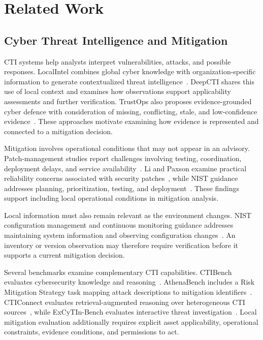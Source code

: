 \documentclass[conference]{IEEEtran}
\begin{document}
\section{Related Work}

\subsection{Cyber Threat Intelligence and Mitigation}

CTI systems help analysts interpret vulnerabilities, attacks, and
possible responses. LocalIntel combines global cyber knowledge with
organization-specific information to generate contextualized threat
intelligence~\cite{mitra2024localintel}. DeepCTI shares this use of local
context and examines how observations support applicability assessments
and further verification. TrustOps also proposes evidence-grounded
cyber defence with consideration of missing, conflicting, stale, and
low-confidence evidence~\cite{malamas2026trustops}. These approaches
motivate examining how evidence is represented and connected to a
mitigation decision.

Mitigation involves operational conditions that may not appear in an
advisory. Patch-management studies report challenges involving testing,
coordination, deployment delays, and service
availability~\cite{dissanayake2022automation,dissanayake2022delays,jenkins2024patching}.
Li and Paxson examine practical reliability concerns associated with
security patches~\cite{li2017securitypatches}, while NIST guidance
addresses planning, prioritization, testing, and
deployment~\cite{souppaya2022patchmanagement}. These findings support
including local operational conditions in mitigation analysis.

Local information must also remain relevant as the environment changes.
NIST configuration management and continuous monitoring guidance
addresses maintaining system information and observing configuration
changes~\cite{johnson2011configuration,dempsey2011monitoring}.
An inventory or version observation may therefore require verification
before it supports a current mitigation decision.

Several benchmarks examine complementary CTI capabilities. CTIBench
evaluates cybersecurity knowledge and reasoning~\cite{alam2024ctibench}.
AthenaBench includes a Risk Mitigation Strategy task mapping attack
descriptions to mitigation identifiers~\cite{alam2025athenabench}.
CTIConnect evaluates retrieval-augmented reasoning over heterogeneous
CTI sources~\cite{cheng2025cticonnect}, while ExCyTIn-Bench evaluates
interactive threat investigation~\cite{wu2025excytin}. Local mitigation
evaluation additionally requires explicit asset applicability,
operational constraints, evidence conditions, and permissions to act.
\end{document}
